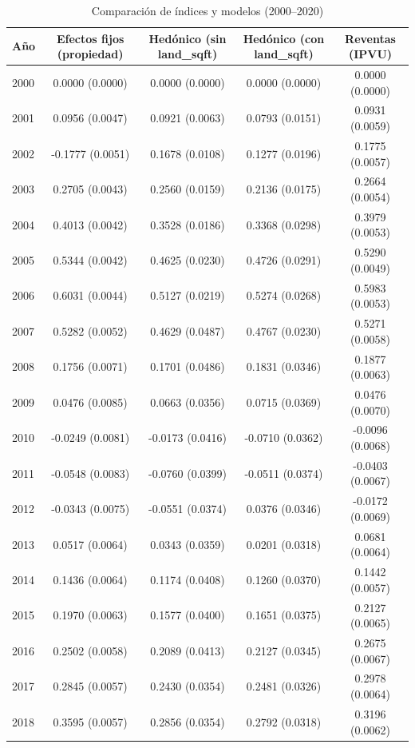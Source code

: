 \documentclass[conference]{IEEEtran}
\begin{document}
\begin{table}[H]
\tiny
\centering
\caption{Comparación de índices y modelos (2000–2020)}
\begin{threeparttable}
\begin{tabular}{lcccc}
\toprule
Año & Efectos fijos (propiedad) & Hedónico (sin land\_sqft) & Hedónico (con land\_sqft) & Reventas (IPVU) \\
\midrule
2000 & 0.0000 (0.0000) & 0.0000 (0.0000) & 0.0000 (0.0000) & 0.0000 (0.0000) \\
2001 & 0.0956 (0.0047) & 0.0921 (0.0063) & 0.0793 (0.0151) & 0.0931 (0.0059) \\
2002 & -0.1777 (0.0051) & 0.1678 (0.0108) & 0.1277 (0.0196) & 0.1775 (0.0057) \\
2003 & 0.2705 (0.0043) & 0.2560 (0.0159) & 0.2136 (0.0175) & 0.2664 (0.0054) \\
2004 & 0.4013 (0.0042) & 0.3528 (0.0186) & 0.3368 (0.0298) & 0.3979 (0.0053) \\
2005 & 0.5344 (0.0042) & 0.4625 (0.0230) & 0.4726 (0.0291) & 0.5290 (0.0049) \\
2006 & 0.6031 (0.0044) & 0.5127 (0.0219) & 0.5274 (0.0268) & 0.5983 (0.0053) \\
2007 & 0.5282 (0.0052) & 0.4629 (0.0487) & 0.4767 (0.0230) & 0.5271 (0.0058) \\
2008 & 0.1756 (0.0071) & 0.1701 (0.0486) & 0.1831 (0.0346) & 0.1877 (0.0063) \\
2009 & 0.0476 (0.0085) & 0.0663 (0.0356) & 0.0715 (0.0369) & 0.0476 (0.0070) \\
2010 & -0.0249 (0.0081) & -0.0173 (0.0416) & -0.0710 (0.0362) & -0.0096 (0.0068) \\
2011 & -0.0548 (0.0083) & -0.0760 (0.0399) & -0.0511 (0.0374) & -0.0403 (0.0067) \\
2012 & -0.0343 (0.0075) & -0.0551 (0.0374) & 0.0376 (0.0346) & -0.0172 (0.0069) \\
2013 & 0.0517 (0.0064) & 0.0343 (0.0359) & 0.0201 (0.0318) & 0.0681 (0.0064) \\
2014 & 0.1436 (0.0064) & 0.1174 (0.0408) & 0.1260 (0.0370) & 0.1442 (0.0057) \\
2015 & 0.1970 (0.0063) & 0.1577 (0.0400) & 0.1651 (0.0375) & 0.2127 (0.0065) \\
2016 & 0.2502 (0.0058) & 0.2089 (0.0413) & 0.2127 (0.0345) & 0.2675 (0.0067) \\
2017 & 0.2845 (0.0057) & 0.2430 (0.0354) & 0.2481 (0.0326) & 0.2978 (0.0064) \\
2018 & 0.3595 (0.0057) & 0.2856 (0.0354) & 0.2792 (0.0318) & 0.3196 (0.0062) \\

\end{tabular}
\end{threeparttable}
\end{table}
\end{document}
